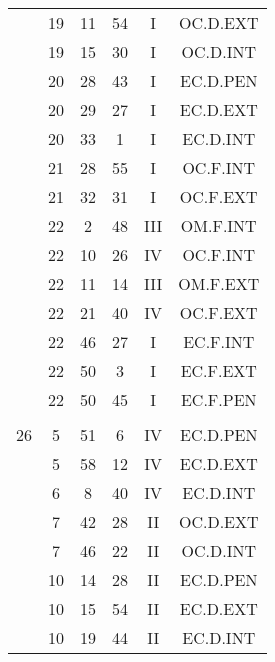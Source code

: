 \documentclass[12pt, a4paper]{article}
\begin{document}
\begin{multicols}{3}
{\begin{tabular}{c c c c c c}
	 	 	 	 & 19 & 11 & 54 & I & OC.D.EXT\\%
	 	 	 	 & 19 & 15 & 30 & I & OC.D.INT\\%
	 	 	 	 & 20 & 28 & 43 & I & EC.D.PEN\\%
	 	 	 	 & 20 & 29 & 27 & I & EC.D.EXT\\%
	 	 	 	 & 20 & 33 & 1 & I & EC.D.INT\\%
	 	 	 	 & 21 & 28 & 55 & I & OC.F.INT\\%
	 	 	 	 & 21 & 32 & 31 & I & OC.F.EXT\\%
	 	 	 	 & 22 & 2 & 48 & III & OM.F.INT\\%
	 	 	 	 & 22 & 10 & 26 & IV & OC.F.INT\\%
	 	 	 	 & 22 & 11 & 14 & III & OM.F.EXT\\%
	 	 	 	 & 22 & 21 & 40 & IV & OC.F.EXT\\%
	 	 	 	 & 22 & 46 & 27 & I & EC.F.INT\\%
	 	 	 	 & 22 & 50 & 3 & I & EC.F.EXT\\%
	 	 	 	 & 22 & 50 & 45 & I & EC.F.PEN\\%
	 	 	 	 & & & & & \\%
	 	 	 	26 & 5 & 51 & 6 & IV & EC.D.PEN\\%
	 	 	 	 & 5 & 58 & 12 & IV & EC.D.EXT\\%
	 	 	 	 & 6 & 8 & 40 & IV & EC.D.INT\\%
	 	 	 	 & 7 & 42 & 28 & II & OC.D.EXT\\%
	 	 	 	 & 7 & 46 & 22 & II & OC.D.INT\\%
	 	 	 	 & 10 & 14 & 28 & II & EC.D.PEN\\%
	 	 	 	 & 10 & 15 & 54 & II & EC.D.EXT\\%
	 	 	 	 & 10 & 19 & 44 & II & EC.D.INT\\%

\end{tabular}}
\end{multicols}
\end{document}
